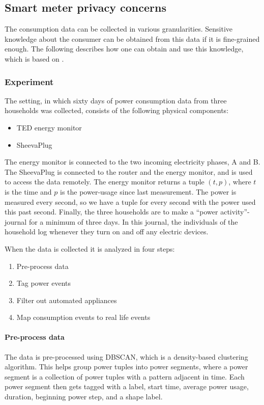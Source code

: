 \subsection{Smart meter privacy concerns}\label{smart_meter_privacy}
The consumption data can be collected in various granularities.
Sensitive knowledge about the consumer can be obtained from this data if it is fine-grained enough.
The following describes how one can obtain and use this knowledge, which is based on \citet{privacy_memoir}.

\subsubsection{Experiment}
The setting, in which sixty days of power consumption data from three households was collected, consists of the following physical components:
\begin{itemize}
\item TED energy monitor
\item SheevaPlug
\end{itemize}
The energy monitor is connected to the two incoming electricity phases, A and B.\cite{TED_installation_guide}
The SheevaPlug is connected to the router and the energy monitor, and is used to access the data remotely.
The energy monitor returns a tuple $(t,p)$, where $t$ is the time and $p$ is the power-usage since last measurement.
The power is measured every second, so we have a tuple for every second with the power used this past second.
Finally, the three households are to make a ``power activity''-journal for a minimum of three days.
In this journal, the individuals of the household log whenever they turn on and off any electric devices.

When the data is collected it is analyzed in four steps:
\begin{enumerate}
\item Pre-process data
\item Tag power events
\item Filter out automated appliances
\item Map consumption events to real life events
\end{enumerate}

\paragraph{Pre-process data}
The data is pre-processed using DBSCAN, which is a density-based clustering algorithm.
This helps group power tuples into power segments, where a power segment is a collection of power tuples with a pattern adjacent in time.
Each power segment then gets tagged with a label, start time, average power usage, duration, beginning power step, and a shape label.

